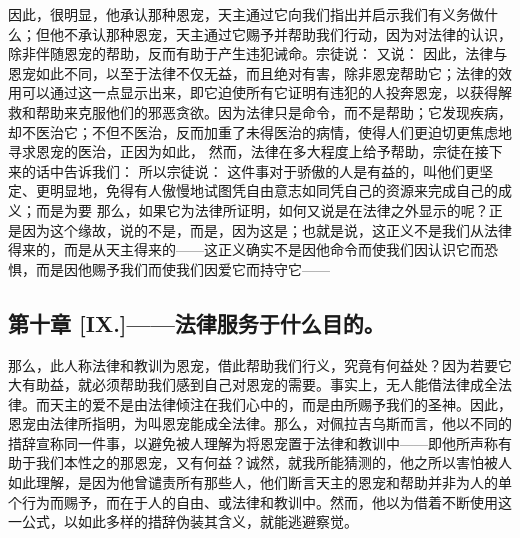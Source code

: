 因此，很明显，他承认那种恩宠，天主通过它向我们指出并启示我们有义务做什么；但他不承认那种恩宠，天主通过它赐予并帮助我们行动，因为对法律的认识，除非伴随恩宠的帮助，反而有助于产生违犯诫命。宗徒说：  又说：  因此，法律与恩宠如此不同，以至于法律不仅无益，而且绝对有害，除非恩宠帮助它；法律的效用可以通过这一点显示出来，即它迫使所有它证明有违犯的人投奔恩宠，以获得解救和帮助来克服他们的邪恶贪欲。因为法律只是命令，而不是帮助；它发现疾病，却不医治它；不但不医治，反而加重了未得医治的病情，使得人们更迫切更焦虑地寻求恩宠的医治，正因为如此，    然而，法律在多大程度上给予帮助，宗徒在接下来的话中告诉我们：  所以宗徒说：  这件事对于骄傲的人是有益的，叫他们更坚定、更明显地，免得有人傲慢地试图凭自由意志如同凭自己的资源来完成自己的成义；而是为要  那么，如果它为法律所证明，如何又说是在法律之外显示的呢？正是因为这个缘故，说的不是，而是，因为这是；也就是说，这正义不是我们从法律得来的，而是从天主得来的——这正义确实不是因他命令而使我们因认识它而恐惧，而是因他赐予我们而使我们因爱它而持守它—— \par


\subsection{第十章 [IX.]——法律服务于什么目的。}

那么，此人称法律和教训为恩宠，借此帮助我们行义，究竟有何益处？因为若要它大有助益，就必须帮助我们感到自己对恩宠的需要。事实上，无人能借法律成全法律。而天主的爱不是由法律倾注在我们心中的，而是由所赐予我们的圣神。因此，恩宠由法律所指明，为叫恩宠能成全法律。那么，对佩拉吉乌斯而言，他以不同的措辞宣称同一件事，以避免被人理解为将恩宠置于法律和教训中——即他所声称有助于我们本性之的那恩宠，又有何益？诚然，就我所能猜测的，他之所以害怕被人如此理解，是因为他曾谴责所有那些人，他们断言天主的恩宠和帮助并非为人的单个行为而赐予，而在于人的自由、或法律和教训中。然而，他以为借着不断使用这一公式，以如此多样的措辞伪装其含义，就能逃避察觉。\par

